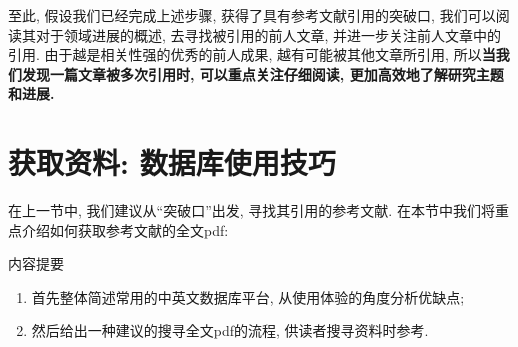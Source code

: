 \documentclass{booki}
\begin{document}
至此, 假设我们已经完成上述步骤, 获得了具有参考文献引用的突破口, 我们可以阅读其对于领域进展的概述, 去寻找被引用的前人文章, 并进一步关注前人文章中的引用. 由于越是相关性强的优秀的前人成果, 越有可能被其他文章所引用, 所以\textbf{当我们发现一篇文章被多次引用时, 可以重点关注仔细阅读, 更加高效地了解研究主题和进展.}

\section{获取资料: 数据库使用技巧}
在上一节中, 我们建议从``突破口''出发, 寻找其引用的参考文献. 在本节中我们将重点介绍如何获取参考文献的全文pdf:

\begin{titledBox}{内容提要}
\begin{enumerate}
    \item 首先整体简述常用的中英文数据库平台, 从使用体验的角度分析优缺点;
    \item 然后给出一种建议的搜寻全文pdf的流程, 供读者搜寻资料时参考.
\end{enumerate}
\end{titledBox}

\end{document}
